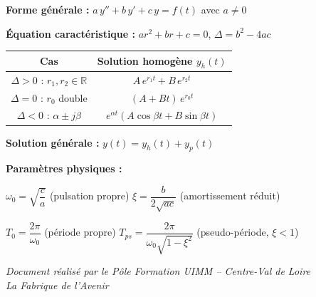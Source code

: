 \documentclass[a4paper,11pt]{article}
\begin{document}
\begin{tcolorbox}[colback=uimmlightblue, colframe=uimmblue, title={\textbf{Formulaire des équations différentielles du 2\textsuperscript{nd} ordre}}, fonttitle=\large\bfseries\sffamily, coltitle=white, boxrule=1.5pt, arc=5pt]

\textbf{Forme générale :} $a\,y'' + b\,y' + c\,y = f(t)$ avec $a \neq 0$

\vspace{6pt}
\textbf{Équation caractéristique :} $ar^2 + br + c = 0$, \quad $\Delta = b^2 - 4ac$

\vspace{6pt}
\renewcommand{\arraystretch}{1.8}
\begin{tabular}{|c|c|}
\hline
\rowcolor{uimmblue!20}
\textbf{Cas} & \textbf{Solution homogène $y_h(t)$} \\
\hline
$\Delta > 0$ : $r_1, r_2 \in \mathbb{R}$ & $A\,e^{r_1 t} + B\,e^{r_2 t}$ \\
\hline
$\Delta = 0$ : $r_0$ double & $(A + Bt)\,e^{r_0 t}$ \\
\hline
$\Delta < 0$ : $\alpha \pm j\beta$ & $e^{\alpha t}(A\cos\beta t + B\sin\beta t)$ \\
\hline
\end{tabular}

\vspace{8pt}
\textbf{Solution générale :} $y(t) = y_h(t) + y_p(t)$

\vspace{6pt}
\textbf{Paramètres physiques :}

$\omega_0 = \sqrt{\dfrac{c}{a}}$ \quad (pulsation propre) \qquad
$\xi = \dfrac{b}{2\sqrt{ac}}$ \quad (amortissement réduit)

\vspace{6pt}
$T_0 = \dfrac{2\pi}{\omega_0}$ \quad (période propre) \qquad
$T_{ps} = \dfrac{2\pi}{\omega_0\sqrt{1-\xi^2}}$ \quad (pseudo-période, $\xi < 1$)
\end{tcolorbox}

\vfill
\begin{center}
\color{uimmgray}\small
\textit{Document réalisé par le Pôle Formation UIMM -- Centre-Val de Loire}\\
\textit{La Fabrique de l'Avenir}
\end{center}
\end{document}

